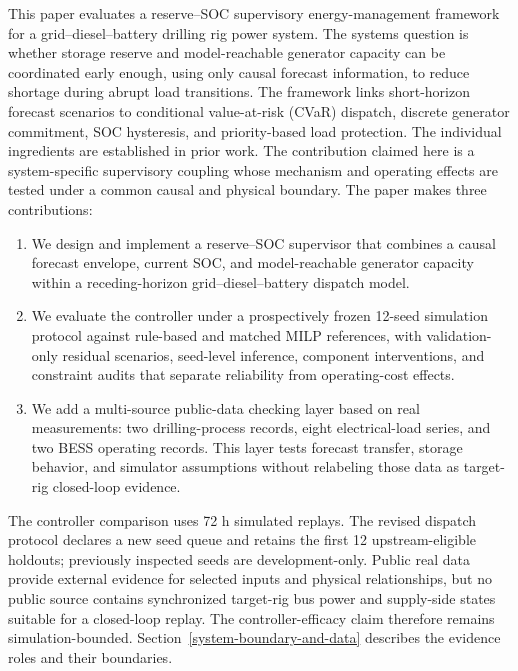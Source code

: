 This paper evaluates a reserve--SOC supervisory energy-management framework
for a grid--diesel--battery drilling rig power system. The systems question is
whether storage reserve and model-reachable generator capacity can be coordinated
early enough, using only causal forecast information, to reduce shortage during
abrupt load transitions. The framework links short-horizon forecast scenarios
to conditional value-at-risk (CVaR) dispatch, discrete generator commitment,
SOC hysteresis, and priority-based load protection. The individual ingredients
are established in prior work. The contribution claimed here is a
system-specific supervisory coupling whose mechanism and operating effects are
tested under a common causal and physical boundary. The paper makes three
contributions:

\begin{enumerate}
\def\labelenumi{\arabic{enumi}.}
\tightlist
\item
  We design and implement a reserve--SOC supervisor that combines a causal
  forecast envelope, current SOC, and model-reachable generator capacity within a
  receding-horizon grid--diesel--battery dispatch model.
\item
  We evaluate the controller under a prospectively frozen 12-seed simulation
  protocol against rule-based and matched MILP references, with validation-only
  residual scenarios, seed-level inference, component interventions, and
  constraint audits that separate reliability from operating-cost effects.
\item
  We add a multi-source public-data checking layer based on real
  measurements: two drilling-process records, eight electrical-load series,
  and two BESS operating records. This layer tests forecast transfer, storage
  behavior, and simulator assumptions without relabeling those data as
  target-rig closed-loop evidence.
\end{enumerate}

The controller comparison uses 72 h simulated replays. The revised dispatch
protocol declares a new seed queue and retains the first 12 upstream-eligible
holdouts; previously inspected seeds are development-only. Public real data
provide external evidence for selected inputs and physical relationships, but
no public source contains synchronized target-rig bus power and supply-side
states suitable for a closed-loop replay. The controller-efficacy claim
therefore remains simulation-bounded. Section~\ref{system-boundary-and-data}
describes the evidence roles and their boundaries.

